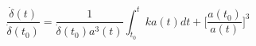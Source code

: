 \begin{equation}\label{firstintegral}
\frac{\dot{\delta}(t)}{\dot{\delta}(t_0)}=\frac{1}{\dot{\delta}(t_0)a^3(t)}
\int_{t_0}^{t}k a(t) dt + \bigg[\frac{a(t_0)}{a(t)}\bigg]^3
\end{equation}

